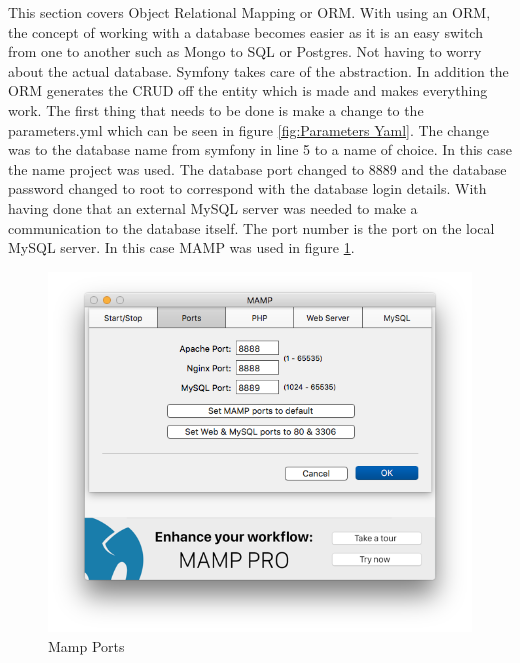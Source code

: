 This section covers Object Relational Mapping or ORM. With using an ORM, the concept of working with a database becomes easier as it is an easy switch from one to another such as Mongo to SQL or Postgres. Not having to worry about the actual database. Symfony takes care of the abstraction. In addition the ORM generates the CRUD off the entity which is made and makes everything work. The first thing that needs to be done is make a change to the parameters.yml which can be seen in figure \ref{fig:Parameters Yaml}. The change was to the database name from symfony in line 5 to a name of choice. In this case the name project was used. The database port changed to 8889 and the database password changed to root to correspond with the database login details. With having done that an external MySQL server was needed to make a communication to the database itself. The port number is the port on the local MySQL server. In this case MAMP was used in figure \ref{fig:Mamp Ports}. 

\begin{figure}[htbp]
   \centering
   \includegraphics[width=400pt]{figures/mamp_ports.png} %
   \caption{Mamp Ports}
   \label{fig:Mamp Ports}
\end{figure}

